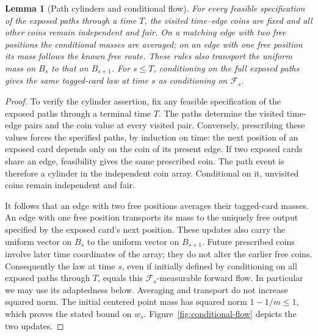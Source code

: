\documentclass[11pt]{article}
\newtheorem{lemma}[theorem]{Lemma}
\theoremstyle{remark}
\numberwithin{equation}{section}
\begin{document}
\begin{samepage}
\begin{lemma}[Path cylinders and conditional flow]\label{lem:path-cylinder}
For every feasible specification of the exposed paths through a time $T$,
the visited time--edge coins are fixed and all other coins remain
independent and fair. On a matching edge with two free positions the
conditional masses are averaged; on an edge with one free position its
mass follows the known free route. These rules also transport the uniform
mass on $B_s$ to that on $B_{s+1}$. For $s\le T$, conditioning on the
full exposed paths gives the same tagged-card law at time $s$ as
conditioning on $\mathcal F_s$.
\end{lemma}
\end{samepage}
\begin{proof}
To verify the cylinder assertion, fix any feasible specification of the exposed paths through a terminal time \(T\). The paths determine the visited time-edge pairs and the coin value at every visited pair. Conversely, prescribing these values forces the specified paths, by induction on time: the next position of an exposed card depends only on the coin of its present edge. If two exposed cards share an edge, feasibility gives the same prescribed coin. The path event is therefore a cylinder in the independent coin array. Conditional on it, unvisited coins remain independent and fair.

It follows that an edge with two free positions averages their tagged-card masses. An edge with one free position transports its mass to the uniquely free output specified by the exposed card's next position. These updates also carry the uniform vector on \(B_s\) to the uniform vector on \(B_{s+1}\). Future prescribed coins involve later time coordinates of the array; they do not alter the earlier free coins. Consequently the law at time \(s\), even if initially defined by conditioning on all exposed paths through \(T\), equals this \(\mathcal F_s\)-measurable forward flow. In particular we may use its adaptedness below. Averaging and transport do not increase squared norm. The initial centered point mass has squared norm $1-1/m\le1$, which proves the stated bound on \(w_s\). Figure~\ref{fig:conditional-flow} depicts the two updates.
\end{proof}


\end{document}
